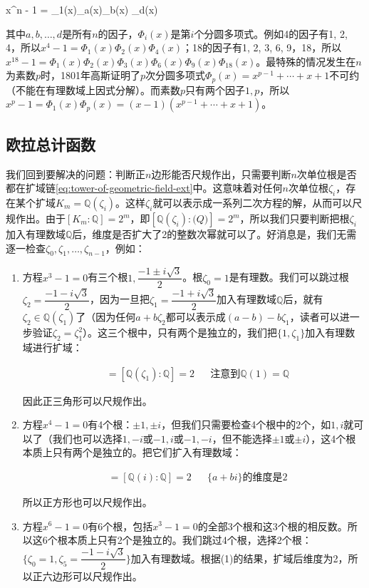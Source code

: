 \be
x^n - 1 = \Phi_1(x)\Phi_a(x)\Phi_b(x) \dotsm \Phi_d(x)
\ee

其中$a, b, \dotsc, d$是所有$n$的因子，$\Phi_i(x)$是第$i$个分圆多项式。例如4的因子有1, 2, 4，所以$x^4 - 1 = \Phi_1(x)\Phi_2(x)\Phi_4(x)$；18的因子有1, 2, 3, 6, 9，18，所以$x^{18} - 1 = \Phi_1(x)\Phi_2(x)\Phi_3(x)\Phi_6(x)\Phi_9(x)\Phi_{18}(x)$。最特殊的情况发生在$n$为素数$p$时，1801年高斯证明了$p$次分圆多项式$\Phi_p(x) = x^{p-1} + \dotsb + x + 1$不可约（不能在有理数域上因式分解）。而素数$p$只有两个因子$1, p$，所以$x^p - 1 = \Phi_1(x)\Phi_p(x) = (x - 1)(x^{p-1} + \dotsb + x + 1)$。

\subsection{欧拉总计函数}
我们回到要解决的问题：判断正$n$边形能否尺规作出，只需要判断$n$次单位根是否都在扩域链\cref{eq:tower-of-geometric-field-ext}中。这意味着对任何$n$次单位根$\zeta_i$，存在某个扩域$K_m = \mathbb{Q}(\zeta_i)$。这样$\zeta_i$就可以表示成一系列二次方程的解，从而可以尺规作出。由于$[K_m : \mathbb{Q}] = 2^m$，即$[\mathbb{Q}(\zeta_i) : \mathbb(Q)] = 2^m$，所以我们只要判断把根$\zeta_i$加入有理数域$\mathbb{Q}$后，维度是否扩大了2的整数次幂就可以了。好消息是，我们无需逐一检查$\zeta_0, \zeta_1, \dotsc, \zeta_{n-1}$，例如：

\begin{enumerate}[(1)]
\item 方程$x^3 - 1 = 0$有三个根$1, \dfrac{-1 \pm i\sqrt{3}}{2}$。根$\zeta_0 = 1$是有理数。我们可以跳过根$\zeta_2 = \dfrac{-1 - i\sqrt{3}}{2}$，因为一旦把$\zeta_1 = \dfrac{-1 + i\sqrt{3}}{2}$加入有理数域$\mathbb{Q}$后，就有$\zeta_2 \in \mathbb{Q}(\zeta_1)$了（因为任何$a + b \zeta_2$都可以表示成$(a - b) - b \zeta_1$，读者可以进一步验证$\zeta_2 = \zeta_1^2$）。这三个根中，只有两个是独立的，我们把$\{1, \zeta_1\}$加入有理数域进行扩域：

\begin{align*}
[\mathbb{Q}(1, \zeta_1) : \mathbb{Q}] &= [\mathbb{Q}(\zeta_1) : \mathbb{Q}] = 2  && \text{注意到}\mathbb{Q}(1) = \mathbb{Q}
\end{align*}

因此正三角形可以尺规作出。

\item 方程$x^4 - 1 = 0$有4个根：$\pm 1, \pm i$，但我们只需要检查4个根中的2个，如$1, i$就可以了（我们也可以选择$1, -i$或$-1, i$或$-1, -i$，但不能选择$\pm 1$或$\pm i$），这4个根本质上只有两个是独立的。把它们扩入有理数域：

\begin{align*}
[\mathbb{Q}(1, i) : \mathbb{Q}] &= [\mathbb{Q}(i) : \mathbb{Q}] = 2 && \{a + bi\}\text{的维度是2}
\end{align*}

所以正方形也可以尺规作出。

\item 方程$x^6 - 1 = 0$有6个根，包括$x^3 - 1 = 0$的全部3个根和这3个根的相反数。所以这6个根本质上只有2个是独立的。我们跳过4个根，选择2个根：$\{\zeta_0 = 1, \zeta_5 = \dfrac{-1 - i\sqrt{3}}{2}\}$加入有理数域。根据(1)的结果，扩域后维度为2，所以正六边形可以尺规作出。
\end{enumerate}

